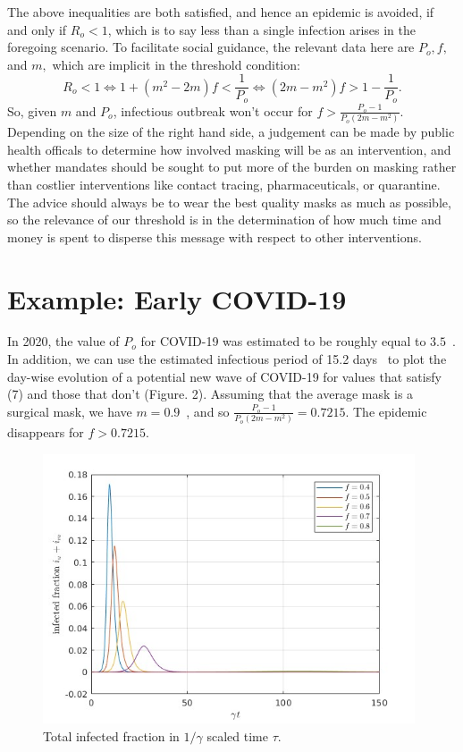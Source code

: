 \documentclass[11pt]{article}
\begin{document}
The above inequalities are both satisfied, and hence an epidemic is avoided, if and only if $R_{o} < 1$, which is to say less than a single infection arises in the foregoing scenario. To facilitate social guidance, the relevant data here are $P_{o}, f,$ and $m,$ which are implicit in the threshold condition:
\begin{equation}
  R_{o} < 1 \iff 1+(m^{2} - 2m) f < \frac{1}{P_{o}} \iff (2m - m^{2})f > 1 - \frac{1}{P_{o}}.
\end{equation}
So, given $m$ and $P_{o}$, infectious outbreak won't occur for $f > \frac{P_{o}-1}{P_{o}(2m - m^{2})}$. Depending on the size of the right hand side, a judgement can be made by public health officals to determine how involved masking will be as an intervention, and whether mandates should be sought to put more of the burden on masking rather than costlier interventions like contact tracing, pharmaceuticals, or quarantine. The advice should always be to wear the best quality masks as much as possible, so the relevance of our threshold is in the determination of how much time and money is spent to disperse this message with respect to other interventions.

\section*{Example: Early COVID-19}
In 2020, the value of $P_{o}$ for COVID-19 was estimated to be roughly equal to $3.5$~\cite{alimohamadi2020estimate}\cite{howard2021evidence}. In addition, we can use the estimated infectious period of 15.2 days~\cite{van2021duration} to plot the day-wise evolution of a potential new wave of COVID-19 for values that satisfy (7) and those that don't (Figure. 2). Assuming that the average mask is a surgical mask, we have $m = 0.9$~\cite{morais2021filtration}, and so $\frac{P_{o}-1}{P_{o}(2m - m^{2})} = 0.7215$. The epidemic disappears for $f > 0.7215$.
\begin{figure}[ht]
  \centering
  \includegraphics[width=11.0cm]{fvals.jpg}
  \caption{\label{fig:11sat} Total infected fraction in $1/\gamma$ scaled time $\tau$. }
\end{figure}
\end{document}
